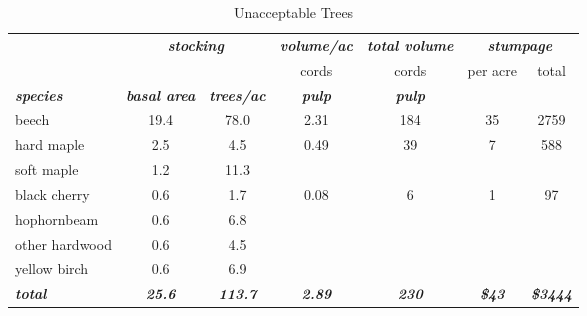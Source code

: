\documentclass[landscape]{article}
\begin{document}
\begin{table}[H]

\caption{\label{tab:unnamed-chunk-57}Unacceptable Trees}
\fontsize{10}{12}\selectfont
\begin{tabular}[t]{lcccccc}
\toprule
\multicolumn{1}{c}{\em{\textbf{ }}} & \multicolumn{2}{c}{\em{\textbf{stocking}}} & \multicolumn{1}{c}{\em{\textbf{volume/ac }}} & \multicolumn{1}{c}{\em{\textbf{total volume}}} & \multicolumn{2}{c}{\em{\textbf{stumpage}}} \\
\cmidrule(l{3pt}r{3pt}){2-3} \cmidrule(l{3pt}r{3pt}){4-4} \cmidrule(l{3pt}r{3pt}){5-5} \cmidrule(l{3pt}r{3pt}){6-7}
\multicolumn{3}{c}{ } & \multicolumn{1}{c}{cords} & \multicolumn{1}{c}{cords} & \multicolumn{1}{c}{per acre} & \multicolumn{1}{c}{total} \\
\cmidrule(l{3pt}r{3pt}){4-4} \cmidrule(l{3pt}r{3pt}){5-5} \cmidrule(l{3pt}r{3pt}){6-6} \cmidrule(l{3pt}r{3pt}){7-7}
\rowcolor[HTML]{DCDCDC}  \em{\textbf{species}} & \em{\textbf{basal area}} & \em{\textbf{trees/ac}} & \em{\textbf{pulp}} & \em{\textbf{pulp}} & \em{\textbf{ }} & \em{\textbf{ }}\\
\midrule
\rowcolor{gray!6}  beech & 19.4 & 78.0 & 2.31 & 184 & 35 & 2759\\
 
hard maple & 2.5 & 4.5 & 0.49 & 39 & 7 & 588\\
 
\rowcolor{gray!6}  soft maple & 1.2 & 11.3 &  &  &  & \\
 
black cherry & 0.6 & 1.7 & 0.08 & 6 & 1 & 97\\
 
\rowcolor{gray!6}  hophornbeam & 0.6 & 6.8 &  &  &  & \\
 
other hardwood & 0.6 & 4.5 &  &  &  & \\
 
\rowcolor{gray!6}  yellow birch & 0.6 & 6.9 &  &  &  & \\
 
\rowcolor[HTML]{DCDCDC}  \em{\textbf{total}} & \em{\textbf{25.6}} & \em{\textbf{113.7}} & \em{\textbf{2.89}} & \em{\textbf{230}} & \em{\textbf{\$43}} & \em{\textbf{\$3444}}\\
\bottomrule
\end{tabular}
\end{table}
\end{document}
